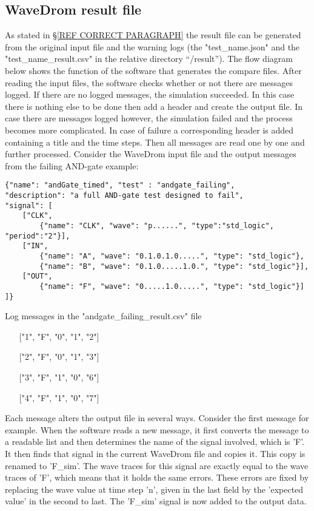 \subsection{WaveDrom result file}
As stated in §\ref{REF CORRECT PARAGRAPH} the result file can be generated from the original input file and the warning logs (the "test\_name.json" and the "test\_name\_result.csv" in the relative directory “/result”). The flow diagram below shows the function of the software that generates the compare files.
\newpage\noindent
After reading the input files, the software checks whether or not there are messages logged. If there are no logged messages, the simulation succeeded. In this case there is nothing else to be done then add a header and create the output file. In case there are messages logged however, the simulation failed and the process becomes more complicated.
\npar
In case of failure a corresponding header is added containing a title and the time steps. Then all messages are read one by one and further processed.
\npar
Consider the WaveDrom input file and the output messages from the failing AND-gate example:
\begin{lstlisting}[style=json, caption={Source file for a failing AND-gate example}, label={json:andgate_failing}]
{"name": "andGate_timed", "test" : "andgate_failing", 
"description": "a full AND-gate test designed to fail", 
"signal": [
	["CLK",
		{"name": "CLK", "wave": "p......", "type":"std_logic", "period":"2"}],
	["IN",
		{"name": "A", "wave": "0.1.0.1.0.....", "type": "std_logic"},
		{"name": "B", "wave": "0.1.0.....1.0.", "type": "std_logic"}],
	["OUT",
		{"name": "F", "wave": "0.....1.0.....", "type": "std_logic"}]
]}
\end{lstlisting}\nline
\begin{customenv}
	\caption{Log messages in the "andgate\_failing\_result.csv" file}
	\begin{itemize}
		\item [] ["1", "F", "0", "1", "2"]
		\item [] ["2", "F", "0", "1", "3"]
		\item [] ["3", "F", "1", "0", "6"]
		\item [] ["4", "F", "1", "0", "7"]
	\end{itemize}
\end{customenv}\nline
Each message alters the output file in several ways. Consider the first message for example. When the software reads a new message, it first converts the message to a readable list and then determines the name of the signal involved, which is 'F'. It then finds that signal in the current WaveDrom file and copies it. This copy is renamed to 'F\_sim'. The wave traces for this signal are exactly equal to the wave traces of 'F', which means that it holds the same errors. These errors are fixed by replacing the wave value at time step 'n', given in the last field by the 'expected value' in the second to last. The 'F\_sim' signal is now added to the output data. 
